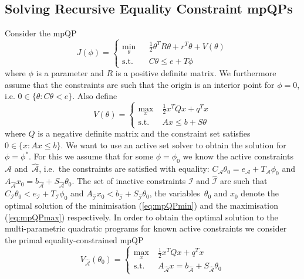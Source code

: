 \documentclass[journal]{IEEEtran}
\theoremstyle{remark}
\theoremstyle{definition}
\begin{document}
\subsection{Solving Recursive Equality Constraint mpQPs}\label{ssec:recursive:mpQP}
%
Consider the mpQP
%
\begin{equation}\label{eq:mpQPmin}
  J(\phi) = \left\{\begin{array}{rcl}
  \displaystyle\min_\theta& &\frac{1}{2} \theta^T R \theta + r^T\theta + V(\theta) \\
  \text{s.t.}& &C\theta\leq e+ T\phi
  \end{array}\right.
\end{equation}
%
where $\phi$ is a parameter and $R$ is a positive definite matrix. 
%
We furthermore assume that the constraints are such that the origin is an interior point for
$\phi=0$, i.e. $0\in\{\theta:C\theta< e\}$.
%
Also define
%
\begin{equation}\label{eq:mpQPmax}
  V(\theta) = \left\{\begin{split}
    \max_x & \;\frac{1}{2} x^T Q x + q^Tx\\
    \text{s.t.} &\; Ax  \leq b +S\theta
  \end{split}\right.
\end{equation}
%
where $Q$ is a negative definite matrix and the constraint set satisfies $0\in\{x : Ax \leq b\}$.
%
We want to use an active set solver to obtain the solution for $\phi=\phi^\ast$.
%
For this we assume that for some $\phi=\phi_0$ we know the active constraints~$\mathcal A$ and~$\hat{\mathcal A}$,
i.e.~the constraints are satisfied with equality: $C_{\mathcal A}\theta_0=e_{\mathcal A} + T_{\mathcal A}\phi_0$
and $A_{\hat{\mathcal A}}x_0=b_{\hat{\mathcal A}}+S_{\hat{\mathcal A}}\theta_0$.
%
The set of inactive constraints $\mathcal I$ and $\hat{\mathcal I}$ are such that $C_{\mathcal I}\theta_0<
e_{\mathcal I} + T_{\mathcal I}\phi_0$ and $A_{\hat{\mathcal I}}x_0<b_{\hat{\mathcal I}}+S_{\hat{\mathcal I}}
\theta_0$, the variables~$\theta_0$ and $x_0$ denote the optimal solution of the minimisation (\ref{eq:mpQPmin}) and the maximisation (\ref{eq:mpQPmax}) respectively.
%
In order to obtain the optimal solution to the multi-parametric quadratic programs for known
active constraints we consider the primal equality-constrained mpQP 
%
\begin{equation}\label{app:mpQP:primal}
  V_{\hat{\mathcal A}}(\theta_0) = \left\{\begin{split}
    \max_x & \;\frac{1}{2} x^T Q x + q^Tx\\
    \text{s.t.} &\; A_{\hat{\mathcal A}}x  = b_{\hat{\mathcal A}} +S_{\hat{\mathcal A}}\theta_0
  \end{split}\right.
\end{equation}
\end{document}
